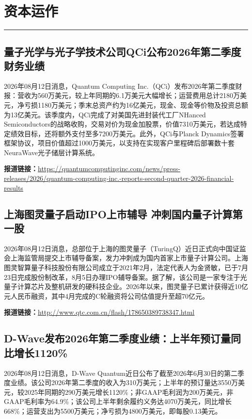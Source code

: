 \documentclass[12pt,a4paper]{ctexart}
\begin{document}
\newpage
\section{资本运作}
\vspace{-0.5em}
\noindent\rule{\linewidth}{1.5pt}

\subsection{ 量子光学与光子学技术公司QCi公布2026年第二季度财务业绩 }

2026年08月12日消息，Quantum Computing Inc.（QCi）发布2026年第二季度财报：营收为560万美元，较上年同期的6.1万美元大幅增长；运营费用总计2180万美元，净亏损1180万美元；季末总资产约为16亿美元，现金、现金等价物及投资总额为13亿美元。该季度内，QCi完成了对美国先进封装代工厂NHanced Semiconductors的战略收购，交易对价为现金加股票，价值7310万美元，若达成特定绩效目标，还将额外支付至多7200万美元。此外，QCi与Planck Dynamics签署框架协议，项目价值超过1000万美元，以支持在实现客户里程碑后部署数十套NeuraWave光子储层计算系统。

\noindent\textbf{报道链接：}\url{https://quantumcomputinginc.com/news/press-releases/2026/quantum-computing-inc.-reports-second-quarter-2026-financial-results}

\subsection{ 上海图灵量子启动IPO上市辅导 冲刺国内量子计算第一股 }

2026年08月12日消息，总部位于上海的图灵量子（TuringQ）近日正式向中国证监会上海监管局提交上市辅导备案，发力冲刺成为国内首家上市量子计算公司。上海图灵智算量子科技股份有限公司成立于2021年2月，法定代表人为金贤敏，已于7月23日完成股份制改革，8月5日办理IPO辅导备案‌。据了解，该公司是一家专注于光量子计算芯片及整机研发‌的硬科技企业。2026年以来，图灵量子已累计获得近10亿元人民币融资，其中4月完成的C轮融资将公司估值提升至超70亿元。

\noindent\textbf{报道链接：}\url{http://www.qtc.com.cn/flash/178650389738347.html}

\subsection{ D-Wave发布2026年第二季度业绩：上半年预订量同比增长1120\% }

2026年08月12日消息，D-Wave Quantum近日公布了截至2026年6月30日的第二季度业绩。该公司2026年第二季度的收入为310万美元；上半年的预订量达3550万美元，较2025年同期的290万美元增长1120\%；非GAAP毛利润为200万美元，非GAAP毛利率为64.9\%；该公司上半年剩余履约义务达4070万美元，同比增长668\%；运营支出为5500万美元；净亏损为4800万美元，即每股0.13美元。
\end{document}

